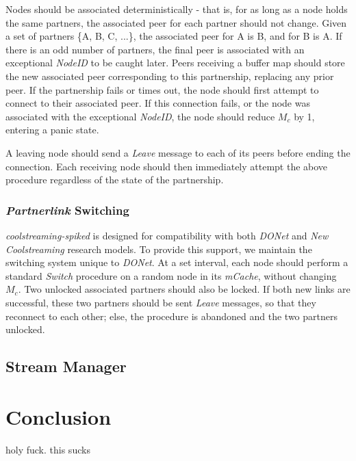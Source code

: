 \documentclass[12pt,a4paper]{article}
\begin{document}
Nodes should be associated deterministically - that is, for as long as a node holds the same partners, the associated peer for each partner should not change. Given a set of partners \{A, B, C, ...\}, the associated peer for A is B, and for B is A. If there is an odd number of partners, the final peer is associated with an exceptional \textit{NodeID} to be caught later. Peers receiving a buffer map should store the new associated peer corresponding to this partnership, replacing any prior peer. If the partnership fails or times out, the node should first attempt to connect to their associated peer. If this connection fails, or the node was associated with the exceptional \textit{NodeID}, the node should reduce \(M_c\) by 1, entering a panic state.

A leaving node should send a \textit{Leave} message to each of its peers before ending the connection. Each receiving node should then immediately attempt the above procedure regardless of the state of the partnership.

\subsubsection{\textit{Partnerlink} Switching}
\textit{coolstreaming-spiked} is designed for compatibility with both \textit{DONet} and \textit{New Coolstreaming} research models. To provide this support, we maintain the switching system unique to \textit{DONet}. At a set interval, each node should perform a standard \textit{Switch} procedure on a random node in its \textit{mCache}, without changing \(M_c\). Two unlocked associated partners should also be locked. If both new links are successful, these two partners should be sent \textit{Leave} messages, so that they reconnect to each other; else, the procedure is abandoned and the two partners unlocked.

\subsection{Stream Manager}


\section{Conclusion}
holy fuck. this sucks

\printbibliography
\end{document}
